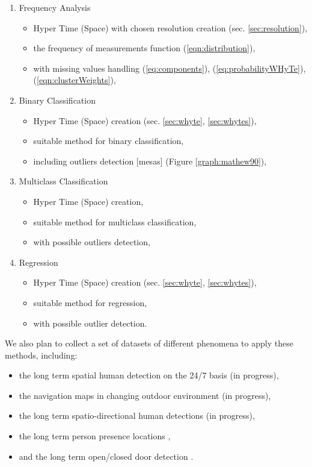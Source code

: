 \begin{enumerate}
    \item Frequency Analysis
    \begin{itemize}
        \item Hyper Time (Space) with chosen resolution creation (sec. \ref{sec:resolution}),
        \item the frequency of measurements function (\ref{eqn:distribution}),
        \item with missing values handling (\ref{eq:components}), (\ref{eq:probabilityWHyTe}), (\ref{eqn:clusterWeights}),
    \end{itemize}
    \item Binary Classification
    \begin{itemize}
        \item Hyper Time (Space) creation (sec. \ref{sec:whyte}, \ref{sec:whytes}),
        \item suitable method for binary classification,
        \item including outliers detection [mesas] (Figure \ref{graph:mathew90}),
    \end{itemize}
    \item Multiclass Classification
    \begin{itemize}
        \item Hyper Time (Space) creation,
        \item suitable method for multiclass classification,
        \item with possible outliers detection,
    \end{itemize}
    \item Regression
    \begin{itemize}
        \item Hyper Time (Space) creation (sec. \ref{sec:whyte}, \ref{sec:whytes}),
        \item suitable method for regression,
        \item with possible outlier detection.
    \end{itemize}
\end{enumerate}

We also plan to collect a set of datasets of different phenomena to apply these methods, including:
\begin{itemize}
    \item the long term spatial human detection on the 24/7 basis (in progress),
    \item the navigation maps in changing outdoor environment (in progress),
    \item the long term spatio-directional human detections (in progress),
    \item the long term person presence locations \cite{krajnik2015s},
    \item and the long term open/closed door detection \cite{krajnik2014long}.
\end{itemize} 
    
        


